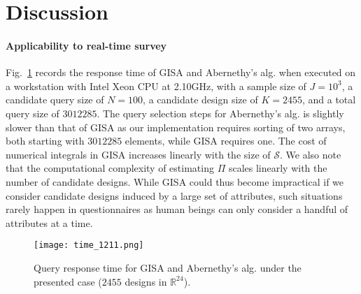 \documentclass[onecolumn,11pt]{article}
\newcommand{\cutsectionup}{\vspace*{-0.1in}}
\newcommand{\cutsectionup}{}
\begin{document}
\cutsectionup
\section{Discussion}
\label{sec:disc}
\paragraph{Applicability to real-time survey}
\label{subsec:realtime}
Fig.~\ref{fig:time} records the response time of GISA and Abernethy's alg. when executed on a workstation with Intel Xeon CPU at 2.10GHz, with a sample size of $J=10^3$, a candidate query size of $N=100$, a candidate design size of $K=2455$, and a total query size of $3012285$. The query selection steps for Abernethy's alg. is slightly slower than that of GISA as our implementation requires sorting of two arrays, both starting with $3012285$ elements, while GISA requires one. The cost of numerical integrals in GISA increases linearly with the size of $\mathcal{S}$. We also note that the computational complexity of estimating $\Pi$ scales linearly with the number of candidate designs. While GISA could thus become impractical if we consider candidate designs induced by a large set of attributes, such situations rarely happen in questionnaires as human beings can only consider a handful of attributes at a time.
\begin{figure}
\centering
\texttt{[image: time\_1211.png]}
\caption{Query response time for GISA and Abernethy's alg. under the presented case ($2455$ designs in $\mathbb{R}^{24}$).}
\label{fig:time}
\end{figure}
\end{document}
